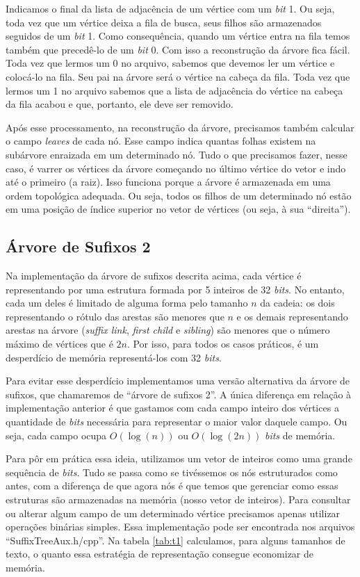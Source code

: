 \documentclass[]{article}
\begin{document}
Indicamos o final da lista de adjacência de um vértice com um \textit{bit} 1. Ou seja, toda vez que um vértice deixa a fila de busca, seus filhos são armazenados seguidos de um \textit{bit} 1. Como consequência, quando um vértice entra na fila temos também que precedê-lo de um \textit{bit} 0. Com isso a reconstrução da árvore fica fácil. Toda vez que lermos um 0 no arquivo, sabemos que devemos ler um vértice e colocá-lo na fila. Seu pai na árvore será o vértice na cabeça da fila. Toda vez que lermos um 1 no arquivo sabemos que a lista de adjacência do vértice na cabeça da fila acabou e que, portanto, ele deve ser removido. 

Após esse processamento, na reconstrução da árvore, precisamos também calcular o campo \textit{leaves} de cada nó. Esse campo indica quantas folhas existem na subárvore enraizada em um determinado nó. Tudo o que precisamos fazer, nesse caso, é varrer os vértices da árvore começando no último vértice do vetor e indo até o primeiro (a raiz). Isso funciona porque a árvore é armazenada em uma ordem topológica adequada. Ou seja, todos os filhos de um determinado nó estão em uma posição de índice superior no vetor de vértices (ou seja, à sua ``direita'').

\subsection{Árvore de Sufixos 2}

Na implementação da árvore de sufixos descrita acima, cada vértice é representando por uma estrutura formada por 5 inteiros de 32 \textit{bits}. No entanto, cada um deles é limitado de alguma forma pelo tamanho $n$ da cadeia: os dois representando o rótulo das arestas são menores que $n$ e os demais representando arestas na árvore (\textit{suffix link}, \textit{first child} e \textit{sibling}) são menores que o número máximo de vértices que é $2n$. Por isso, para todos os casos práticos, é um desperdício de memória representá-los com 32 \textit{bits}.

Para evitar esse desperdício implementamos uma versão alternativa da árvore de sufixos, que chamaremos de ``árvore de sufixos 2''. A única diferença em relação à implementação anterior é que gastamos com cada campo inteiro dos vértices a quantidade de \textit{bits} necessária para representar o maior valor daquele campo. Ou seja, cada campo ocupa $O(\log(n))$ ou $O(\log(2n))$ \textit{bits} de memória.

Para pôr em prática essa ideia, utilizamos um vetor de inteiros como uma grande sequência de \textit{bits}. Tudo se passa como se tivéssemos os nós estruturados como antes, com a diferença de que agora nós é que temos que gerenciar como essas estruturas são armazenadas na memória (nosso vetor de inteiros). Para consultar ou alterar algum campo de um determinado vértice precisamos apenas utilizar operações binárias simples. Essa implementação pode ser encontrada nos arquivos ``SuffixTreeAux.h/cpp''. Na tabela \ref{tab:t1} calculamos, para alguns tamanhos de texto, o quanto essa estratégia de representação consegue economizar de memória.
\end{document}
